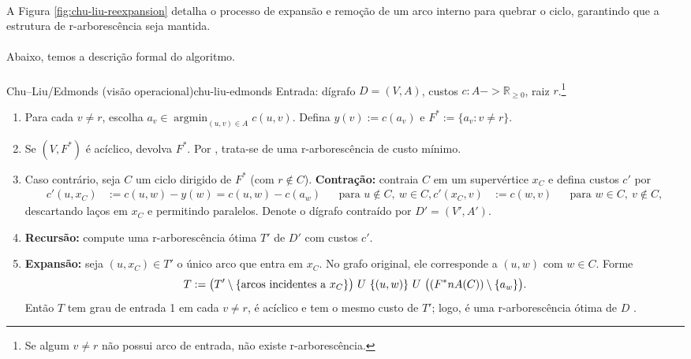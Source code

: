 \documentclass[12pt,a4paper]{article}
\def\\{}%
\def\cup{\string U}%
\def\cap{\string n}%
\def\to{->}%
\begin{document}
\paragraph{}
A Figura \ref{fig:chu-liu-reexpansion} detalha o processo de expansão e remoção de um arco interno para quebrar o ciclo, garantindo que a estrutura de r-arborescência seja mantida.

\paragraph{}
Abaixo, temos a descrição formal do algoritmo.
\paragraph{}
\begin{algobox}{Chu–Liu/Edmonds (visão operacional)}{chu-liu-edmonds}
    Entrada: dígrafo \(D=(V,A)\), custos \(c:A\to\mathbb{R}_{\ge 0}\), raiz \(r\).\footnote{Se algum \(v\neq r\) não possui arco de entrada, não existe r-arborescência.}
    \begin{enumerate}\setlength{\itemsep}{2pt}
        \item Para cada \(v\neq r\), escolha \(a_v\in\operatorname*{argmin}_{(u,v)\in A} c(u,v)\). Defina \(y(v):=c(a_v)\) e \(F^*:=\{a_v: v\neq r\}.\)
        \item Se \((V,F^*)\) é acíclico, devolva \(F^*\). Por \cite[Obs.~4.36]{kleinberg2006}, trata-se de uma r-arborescência de custo mínimo.
        \item Caso contrário, seja \(C\) um ciclo dirigido de \(F^*\) (com \(r\notin C\)). \textbf{Contração:} contraia \(C\) em um supervértice \(x_C\) e defina custos \(c'\) por
              \begin{align*}
                  c'(u,x_C) & := c(u,w) - y(w) = c(u,w) - c(a_w) &  & \text{para } u\notin C,\ w\in C, \\
                  c'(x_C,v) & := c(w,v)                          &  & \text{para } w\in C,\ v\notin C,
              \end{align*}
              descartando laços em \(x_C\) e permitindo paralelos. Denote o dígrafo contraído por \(D'=(V',A')\).
        \item \textbf{Recursão:} compute uma r-arborescência ótima \(T'\) de \(D'\) com custos \(c'\).
        \item \textbf{Expansão:} seja \((u,x_C)\in T'\) o único arco que entra em \(x_C\). No grafo original, ele corresponde a \((u,w)\) com \(w\in C\). Forme
              \[
                  T := \bigl(T'\setminus\{\text{arcos incidentes a } x_C\}\bigr)\ \cup\ \{(u,w)\}\ \cup\ \bigl((F^*\cap A(C))\setminus\{a_w\}\bigr).
              \]
              Então \(T\) tem grau de entrada 1 em cada \(v\neq r\), é acíclico e tem o mesmo custo de \(T'\); logo, é uma r-arborescência ótima de \(D\) \cite[Sec.~4.9]{kleinberg2006,schrijver2003comb}.
    \end{enumerate}
\end{algobox}
\end{document}
